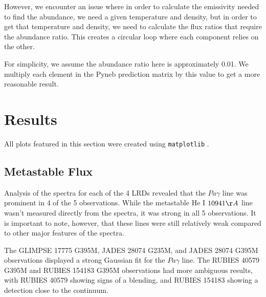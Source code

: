 \documentclass[letterpaper]{aastex701}
\begin{document}
However, we encounter an issue where in order to calculate the emissivity needed to find the abundance, we need a given temperature and density, but in order to get that temperature and density, we need to calculate the flux ratios that require the abundance ratio. This creates a circular loop where each component relies on the other. 

For simplicity, we assume the abundance ratio here is approximately 0.01. We multiply each element in the Pyneb prediction matrix by this value to get a more reasonable result. %

\section{Results}

All plots featured in this section were created using \texttt{matplotlib} \citep{Hunter:2007}.

\subsection{Metastable Flux}

Analysis of the spectra for each of the 4 LRDs revealed that the $Pa\gamma$ line was prominent in 4 of the 5 observations. While the metastable He I $10941\AA$ line wasn't measured directly from the spectra, it was strong in all 5 observations. It is important to note, however, that these lines were still relatively weak compared to other major features of the spectra. %

The GLIMPSE 17775 G395M, JADES 28074 G235M, and JADES 28074 G395M observations displayed a strong Gaussian fit for the $Pa\gamma$ line. The RUBIES 40579 G395M and RUBIES 154183 G395M observations had more ambiguous results, with RUBIES 40579 showing signs of a blending, and RUBIES 154183 showing a detection close to the continuum.
\end{document}

